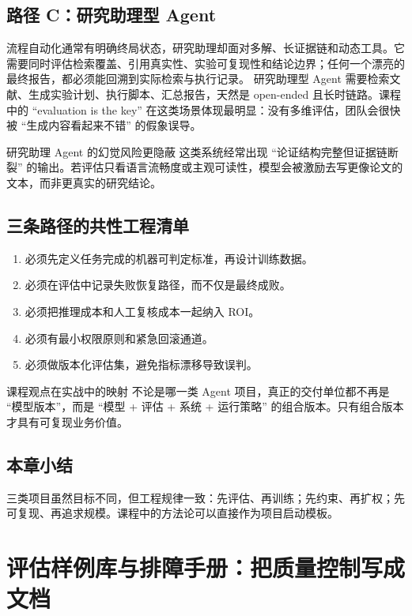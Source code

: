 \documentclass[a4paper]{article}
\begin{document}
\subsection{路径 C：研究助理型 Agent}
流程自动化通常有明确终局状态，研究助理却面对多解、长证据链和动态工具。它需要同时评估检索覆盖、引用真实性、实验可复现性和结论边界；任何一个漂亮的最终报告，都必须能回溯到实际检索与执行记录。
研究助理型 Agent 需要检索文献、生成实验计划、执行脚本、汇总报告，天然是 open-ended 且长时链路。课程中的 ``evaluation is the key'' 在这类场景体现最明显：没有多维评估，团队会很快被 ``生成内容看起来不错'' 的假象误导。

\begin{warningbox}{研究助理 Agent 的幻觉风险更隐蔽}
这类系统经常出现 ``论证结构完整但证据链断裂'' 的输出。若评估只看语言流畅度或主观可读性，模型会被激励去写更像论文的文本，而非更真实的研究结论。
\end{warningbox}

\subsection{三条路径的共性工程清单}
\begin{enumerate}
    \item 必须先定义任务完成的机器可判定标准，再设计训练数据。
    \item 必须在评估中记录失败恢复路径，而不仅是最终成败。
    \item 必须把推理成本和人工复核成本一起纳入 ROI。
    \item 必须有最小权限原则和紧急回滚通道。
    \item 必须做版本化评估集，避免指标漂移导致误判。
\end{enumerate}

\begin{importantbox}{课程观点在实战中的映射}
不论是哪一类 Agent 项目，真正的交付单位都不再是 ``模型版本''，而是 ``模型 + 评估 + 系统 + 运行策略'' 的组合版本。只有组合版本才具有可复现业务价值。
\end{importantbox}

\subsection{本章小结}
三类项目虽然目标不同，但工程规律一致：先评估、再训练；先约束、再扩权；先可复现、再追求规模。课程中的方法论可以直接作为项目启动模板。


\section{评估样例库与排障手册：把质量控制写成文档}
\end{document}
